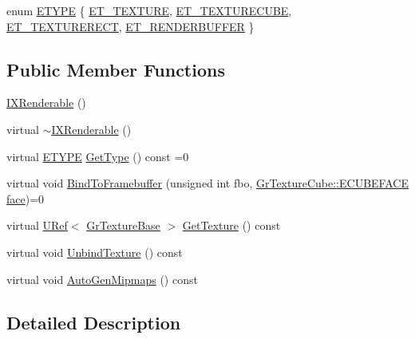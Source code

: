 \begin{CompactItemize}
\item 
enum \hyperlink{class_i_x_renderable_a83cb64592404acfb99afbc55a4ed8a8}{ETYPE} \{ \hyperlink{class_i_x_renderable_a83cb64592404acfb99afbc55a4ed8a84330ba990bc439cc6db7227ea872d6ff}{ET\_\-TEXTURE}, 
\hyperlink{class_i_x_renderable_a83cb64592404acfb99afbc55a4ed8a81996a1c87b7fdc3bdb2c840f928e9d95}{ET\_\-TEXTURECUBE}, 
\hyperlink{class_i_x_renderable_a83cb64592404acfb99afbc55a4ed8a8b82ed50babd41f736f18c62c0bd4f82a}{ET\_\-TEXTURERECT}, 
\hyperlink{class_i_x_renderable_a83cb64592404acfb99afbc55a4ed8a8ab5d8d91dd99a5c558e9cbfa36e6b579}{ET\_\-RENDERBUFFER}
 \}
\subsection*{Public Member Functions}
\begin{CompactItemize}
\item 
\hyperlink{class_i_x_renderable_3b6b8d3b41c8ad45864922a1dedd3d04}{IXRenderable} ()
\item 
virtual \hyperlink{class_i_x_renderable_83506efaeb52b2170bf0c643edcb56aa}{$\sim$IXRenderable} ()
\item 
virtual \hyperlink{class_i_x_renderable_a83cb64592404acfb99afbc55a4ed8a8}{ETYPE} \hyperlink{class_i_x_renderable_aa7a8918c305cc562df3f3f44cd761d7}{GetType} () const =0
\item 
virtual void \hyperlink{class_i_x_renderable_c5ea40caedef9885429ab5c7dccb0163}{BindToFramebuffer} (unsigned int fbo, \hyperlink{class_gr_texture_cube_49c6f83c73520edfce04f4eb5dcfe6a0}{GrTextureCube::ECUBEFACE} \hyperlink{glext_8h_676ca580c460c0154eb58200433d2a9e}{face})=0
\item 
virtual \hyperlink{class_u_ref}{URef}$<$ \hyperlink{class_gr_texture_base}{GrTextureBase} $>$ \hyperlink{class_i_x_renderable_2a74a8b8f702af0557134858ec263aea}{GetTexture} () const 
\item 
virtual void \hyperlink{class_i_x_renderable_a6c88c0ccc0cc869114309de6843f5ac}{UnbindTexture} () const 
\item 
virtual void \hyperlink{class_i_x_renderable_4e47253020e9f0faabb51b37ee5e16ae}{AutoGenMipmaps} () const 
\end{CompactItemize}


\subsection{Detailed Description}



\end{CompactItemize}
